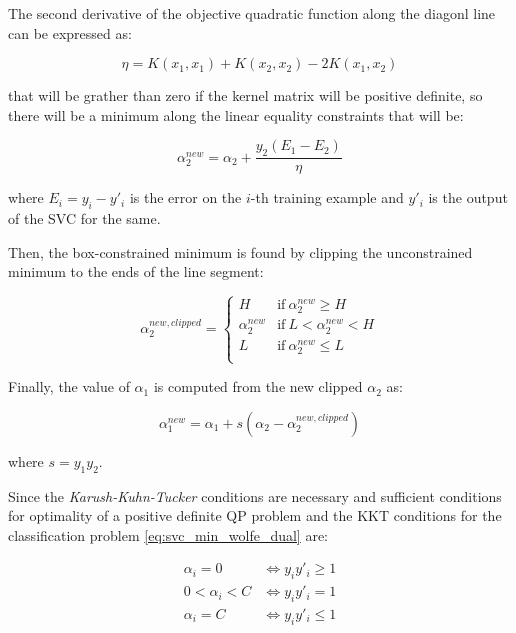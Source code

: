 The second derivative of the objective quadratic function along the diagonl line can be expressed as:

\begin{equation} \label{eq:smo_eta}
	\eta = K(x_1, x_1) + K(x_2, x_2) - 2K(x_1, x_2)
\end{equation}

that will be grather than zero if the kernel matrix will be positive definite, so there will be a minimum along the linear equality constraints that will be:

\begin{equation} \label{eq:smo_svc_a2_new}
	\alpha_2^{new} = \alpha_2 + \frac{y_2(E_1 - E_2)}{\eta}
\end{equation}

where $E_i = y_i - y'_i$ is the error on the $i$-th training example and $y'_i$ is the output of the SVC for the same.

Then, the box-constrained minimum is found by clipping the unconstrained minimum to the ends of the line segment:

\begin{equation} \label{eq:smo_svc_a2_new_clipped}
    \alpha_2^{new,clipped} =
        \begin{cases}
            H & \text{if} \ \alpha_2^{new} \geq H \\
            \alpha_2^{new} & \text{if} \ L < \alpha_2^{new} < H \\
            L & \text{if} \ \alpha_2^{new} \leq L \\
        \end{cases}
\end{equation}

Finally, the value of $\alpha_1$ is computed from the new clipped $\alpha_2$ as:

\begin{equation} \label{eq:smo_svc_a1_new}
	\alpha_1^{new} = \alpha_1 + s (\alpha_2 - \alpha_2^{new,clipped})
\end{equation}

where $s = y_1 y_2$.

Since the \emph{Karush-Kuhn-Tucker} conditions are necessary and sufficient conditions for optimality of a positive definite QP problem and the KKT conditions for the classification problem \eqref{eq:svc_min_wolfe_dual} are:

\begin{equation} \label{eq:svc_smo_kkt}
	\begin{aligned}
		\alpha_i = 0 & \Leftrightarrow y_i y'_i \geq 1 \\
		0 < \alpha_i < C & \Leftrightarrow y_i y'_i = 1 \\
		\alpha_i = C & \Leftrightarrow y_i y'_i \leq 1
	\end{aligned}
\end{equation}

